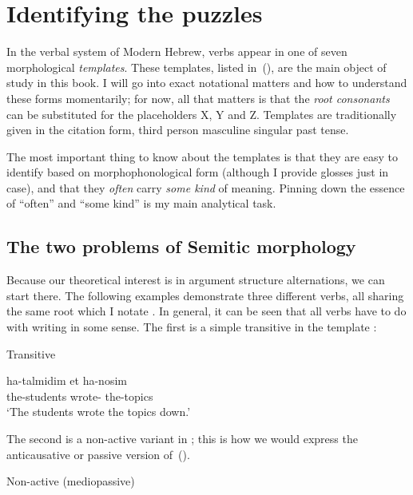 \section{Identifying the puzzles} \label{intro:puzzles}
In the verbal system of Modern Hebrew, verbs appear in one of seven morphological \emph{templates}. These templates, listed in~(\nextx), are the main object of study in this book. I will go into exact notational matters and how to understand these forms momentarily; for now, all that matters is that the \emph{root consonants} can be substituted for the placeholders X, Y and Z. Templates are traditionally given in the citation form, third person masculine singular past tense.
 \begin{exe}
 \ex  
 \begin{xlist} 
 	\ex  {\tkal} 
 	\ex  {\tnif} 
 	\ex  {\tpie} 
 	\ex  {\thit} 
 	\ex  {\thif} 
 	\ex  {\tpua} 
 	\ex  {\thuf} 
 \z
\z 

The most important thing to know about the templates is that they are easy to identify based on morphophonological form (although I provide glosses just in case), and that they \emph{often} carry \emph{some kind} of meaning. Pinning down the essence of ``often'' and ``some kind'' is my main analytical task.

	\subsection{The two problems of Semitic morphology}
Because our theoretical interest is in argument structure alternations, we can start there. The following examples demonstrate three different verbs, all sharing the same root which I notate . In general, it can be seen that all verbs have to do with writing in some sense. The first is a simple transitive in the template {\tkal}:
 \begin{exe}
\ex 	\label{ex:intro-tkal}Transitive {\tkal} 
		
 		\gll  ha-talmidim  et ha-nosim\\
 		  the-students wrote-  the-topics\\
 		\glt `The students wrote the topics down.' 
	
 \z 

The second is a non-active variant in {\tnif}; this is how we would express the anticausative or passive version of~(\lastx).
 \begin{exe}
\ex  \label{ex:intro-tnif}Non-active (mediopassive) {\tnif} 
		

\end{exe}
\end{exe}
\end{xlist}
\end{exe}
